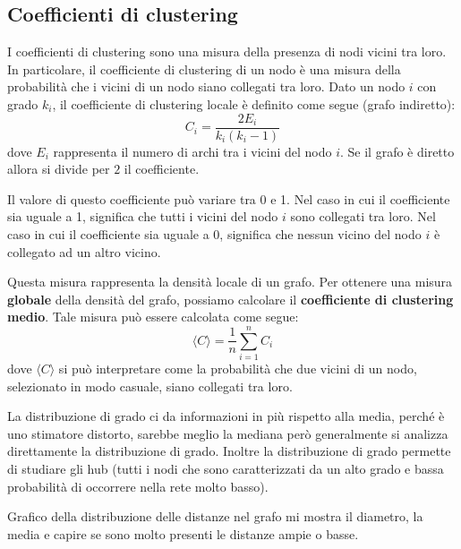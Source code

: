 \subsection{Coefficienti di clustering}
\begin{definizione}
    I coefficienti di clustering sono una misura della presenza di nodi vicini
    tra loro. In particolare, il coefficiente di clustering di un nodo è una
    misura della probabilità che i vicini di un nodo siano collegati tra loro.
    Dato un nodo $i$ con grado $k_i$, il coefficiente di clustering locale è
    definito come segue (grafo indiretto):
    \begin{equation}
        C_i = \frac{2E_i}{k_i(k_i - 1)}
    \end{equation}
    dove $E_i$ rappresenta il numero di archi tra i vicini del nodo $i$. Se il grafo
    è diretto allora si divide per $2$ il coefficiente.
\end{definizione}

Il valore di questo coefficiente può variare tra 0 e 1. Nel caso in cui il
coefficiente sia uguale a 1, significa che tutti i vicini del nodo $i$ sono
collegati tra loro. Nel caso in cui il coefficiente sia uguale a 0, significa
che nessun vicino del nodo $i$ è collegato ad un altro vicino.


Questa misura rappresenta la densità locale di un grafo. Per ottenere una
misura \textbf{globale} della densità del grafo, possiamo calcolare il \textbf{coefficiente
    di clustering medio}. Tale misura può essere calcolata come segue:
\begin{equation}
    \langle C \rangle = \frac{1}{n} \sum_{i=1}^{n} C_i
\end{equation}
dove $\langle C \rangle$ si può interpretare come la probabilità che due vicini
di un nodo, selezionato in modo casuale, siano collegati tra loro. 

La distribuzione di grado ci da informazioni in più rispetto alla media, perché
è uno stimatore distorto, sarebbe meglio la mediana però generalmente si analizza
direttamente la distribuzione di grado. Inoltre la distribuzione di grado permette 
di studiare gli hub (tutti i nodi che sono caratterizzati da un alto grado e bassa 
probabilità di occorrere nella rete molto basso).

Grafico della distribuzione delle distanze nel grafo mi mostra il diametro, la media 
e capire se sono molto presenti le distanze ampie o basse.


